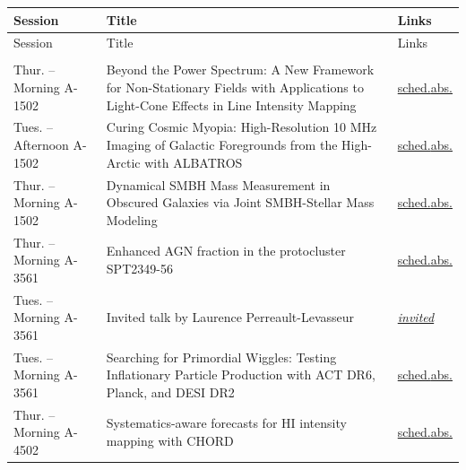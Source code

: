 {\small
\setlength{\emergencystretch}{1em}
\begin{longtable}{@{}>{\TableRaggedRight\arraybackslash\hspace{0pt}}p{} >{\TableRaggedRight\arraybackslash\hspace{0pt}}p{} >{\TableRaggedRight\arraybackslash\hspace{0pt}}p{}@{}}
\toprule
Session & Title & Links \\
\midrule
\endfirsthead
\toprule
Session & Title & Links \\
\midrule
\endhead
\addlinespace[0.15em]
\multicolumn{3}{@{}l}{\sffamily\bfseries\color{cascateal} Talks} \\
\addlinespace[0.1em]
Thur. -- Morning A-1502 & Beyond the Power Spectrum: A New Framework for Non-Stationary Fields with Applications to Light-Cone Effects in Line Intensity Mapping & \hyperlink{schedule-talk-251}{sched.}\newline \hyperlink{abstract-talk-251}{abs.} \\
Tues. -- Afternoon A-1502 & Curing Cosmic Myopia: High-Resolution 10 MHz Imaging of Galactic Foregrounds from the High-Arctic with ALBATROS & \hyperlink{schedule-talk-200}{sched.}\newline \hyperlink{abstract-talk-200}{abs.} \\
Thur. -- Morning A-1502 & Dynamical SMBH Mass Measurement in Obscured Galaxies via Joint SMBH-Stellar Mass Modeling & \hyperlink{schedule-talk-330}{sched.}\newline \hyperlink{abstract-talk-330}{abs.} \\
Thur. -- Morning A-3561 & Enhanced AGN fraction in the protocluster SPT2349-56 & \hyperlink{schedule-talk-327}{sched.}\newline \hyperlink{abstract-talk-327}{abs.} \\
Tues. -- Morning A-3561 & Invited talk by Laurence Perreault-Levasseur & \hyperlink{invited-laurence-perreault-levasseur}{\textit{invited}} \\
Tues. -- Morning A-3561 & Searching for Primordial Wiggles: Testing Inflationary Particle Production with ACT DR6, Planck, and DESI DR2 & \hyperlink{schedule-talk-69}{sched.}\newline \hyperlink{abstract-talk-69}{abs.} \\
Thur. -- Morning A-4502 & Systematics-aware forecasts for HI intensity mapping with CHORD & \hyperlink{schedule-talk-43}{sched.}\newline \hyperlink{abstract-talk-43}{abs.} \\

\end{longtable}}
